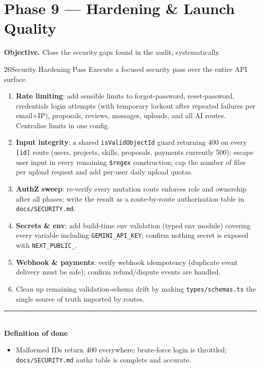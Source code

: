 \documentclass[11pt,a4paper]{article}
\newcommand{\dod}{\medskip\noindent\textcolor{donegreen}{\rule{\linewidth}{0.5pt}}\\[1mm]\textbf{\textcolor{donegreen}{Definition of done}}\\[-2mm]}
\newcommand{\objective}[1]{\noindent\textbf{Objective.} #1\medskip}
\newcommand{\filepath}[1]{\texttt{#1}}
\begin{document}
\section{Phase 9 --- Hardening \& Launch Quality}

\objective{Close the security gaps found in the audit, systematically.}

\begin{promptbox}{26}{Security Hardening Pass}
Execute a focused security pass over the entire API surface.

\begin{enumerate}[leftmargin=1.6em]
  \item \textbf{Rate limiting}: add sensible limits to forgot-password,
        reset-password, credentials login attempts (with temporary lockout after
        repeated failures per email+IP), proposals, reviews, messages, uploads, and
        all AI routes. Centralise limits in one config.
  \item \textbf{Input integrity}: a shared \texttt{isValidObjectId} guard returning
        400 on every \texttt{[id]} route (users, projects, skills, proposals,
        payments currently 500); escape user input in every remaining
        \texttt{\$regex} construction; cap the number of files per upload request and
        add per-user daily upload quotas.
  \item \textbf{AuthZ sweep}: re-verify every mutation route enforces role and
        ownership after all phases; write the result as a route-by-route
        authorization table in \filepath{docs/SECURITY.md}.
  \item \textbf{Secrets \& env}: add build-time env validation (typed env module)
        covering every variable including \texttt{GEMINI\_API\_KEY}; confirm nothing
        secret is exposed with \texttt{NEXT\_PUBLIC\_}.
  \item \textbf{Webhook \& payments}: verify webhook idempotency (duplicate event
        delivery must be safe); confirm refund/dispute events are handled.
  \item Clean up remaining validation-schema drift by making \filepath{types/schemas.ts}
        the single source of truth imported by routes.
\end{enumerate}

\dod
\begin{itemize}[leftmargin=1.6em]
  \item Malformed IDs return 400 everywhere; brute-force login is throttled;
        \filepath{docs/SECURITY.md} authz table is complete and accurate.
\end{itemize}
\end{promptbox}
\end{document}
